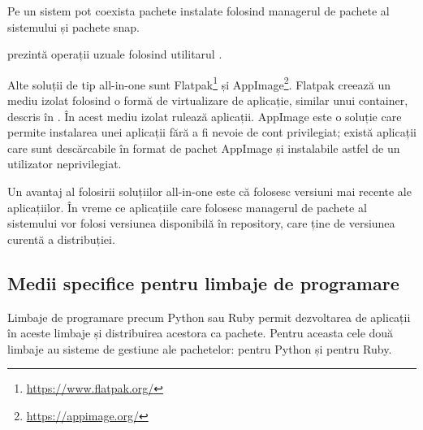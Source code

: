 Pe un sistem pot coexista pachete instalate folosind managerul de pachete al sistemului și pachete snap.

 prezintă operații uzuale folosind utilitarul .


Alte soluții de tip all-in-one sunt Flatpak\footnote{\url{https://www.flatpak.org/}} și AppImage\footnote{\url{https://appimage.org/}}.
Flatpak creează un mediu izolat folosind o formă de virtualizare de aplicație, similar unui container, descris în .
În acest mediu izolat rulează aplicații.
AppImage este o soluție care permite instalarea unei aplicații fără a fi nevoie de cont privilegiat;
există aplicații care sunt descărcabile în format de pachet AppImage și instalabile astfel de un utilizator neprivilegiat.

Un avantaj al folosirii soluțiilor all-in-one este că folosesc versiuni mai recente ale aplicațiilor.
În vreme ce aplicațiile care folosesc managerul de pachete al sistemului vor folosi versiunea disponibilă în repository, care ține de versiunea curentă a distribuției.

\subsection{Medii specifice pentru limbaje de programare}
\label{sec:package:specific}

Limbaje de programare precum Python sau Ruby permit dezvoltarea de aplicații în aceste limbaje și distribuirea acestora ca pachete.
Pentru aceasta cele două limbaje au sisteme de gestiune ale pachetelor:  pentru Python și  pentru Ruby.

